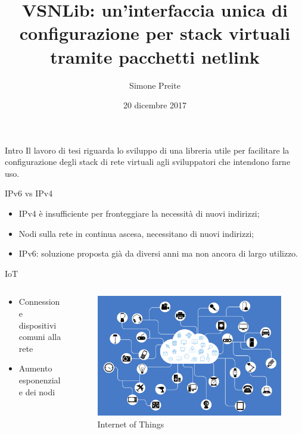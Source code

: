 \documentclass{beamer}
\author{Simone Preite}
\title{VSNLib: un'interfaccia unica di configurazione per stack virtuali tramite pacchetti netlink}
\date{20 dicembre 2017}
\begin{document}
\titlepageframe %


\begin{frame}[fragile]{Intro}
Il lavoro di tesi riguarda lo sviluppo di una libreria utile per facilitare la configurazione degli stack di rete virtuali  agli sviluppatori che intendono farne uso.
\end{frame}

\begin{frame}[fragile]{IPv6 vs IPv4}

\begin{itemize}
    \item IPv4 \`e insufficiente per fronteggiare la necessit\`a di nuovi indirizzi;
    \item Nodi sulla rete in continua ascesa, necessitano di nuovi indirizzi;
    \item IPv6: soluzione proposta gi\`a da diversi anni ma non ancora di largo utilizzo.
\end{itemize}
\end{frame}


\begin{frame}[fragile]{IoT}

\begin{columns}[T]
\begin{column}{.30\textwidth}
\newline
\begin{itemize}
    \item Connessione dispositivi comuni alla rete\newline
		\item Aumento esponenziale dei nodi\newline

\end{itemize}

\end{column}%
\hfill%
\begin{column}{.50\textwidth}
    \begin{figure}[t!]
    \includegraphics[scale=.08]{img/IoT.png}
    \caption{Internet of Things}
    \centering

\end{figure}
\end{column}%
\end{columns}
\end{frame}
\end{document}
